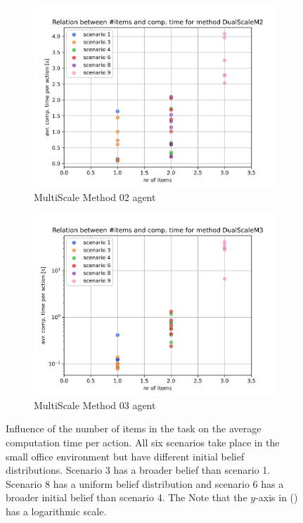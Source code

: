 \begin{figure}
\begin{subfigure}[b]{0.49\textwidth}
        \includegraphics[width=\textwidth]{Report/images/nr_of_items/items_vs_comptime_DualScaleM2.png}
        \caption{MultiScale Method 02 agent}
        \label{subfig:nr_of_items_D2}
    \end{subfigure}
    \hfill
    \begin{subfigure}[b]{0.49\textwidth}
         \includegraphics[width=\textwidth]{Report/images/nr_of_items/items_vs_comptime_DualScaleM3.png}
        \caption{MultiScale Method 03 agent}
        \label{subfig:nr_of_items_D3}
    \end{subfigure}
     \caption{Influence of the number of items in the task on the average computation time per action. All six scenarios take place in the small office environment but have different initial belief distributions. Scenario 3 has a broader belief than scenario 1. Scenario 8 has a uniform belief distribution and scenario 6 has a broader initial belief than scenario 4. The Note that the $y$-axis in () has a logarithmic scale. }
    \label{fig:nr_of_items}
\end{figure}

